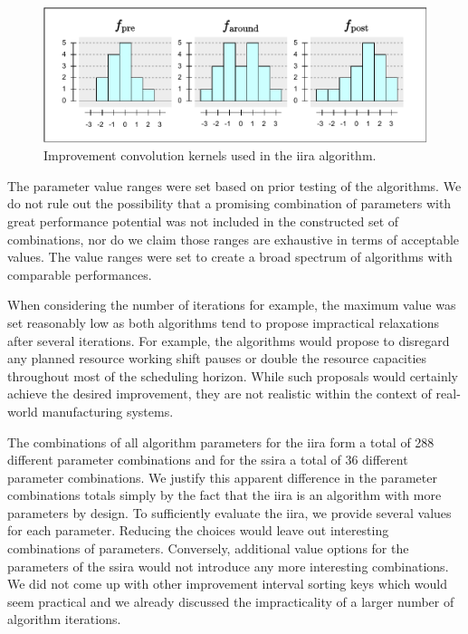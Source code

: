 \begin{figure}[hbt]
    \centering
    \includegraphics[width=\textwidth]{img/Convolutions.pdf}
    \caption{Improvement convolution kernels used in the \ac{iira} algorithm.}
    \label{fig:convolutions}
\end{figure}

The parameter value ranges were set based on prior testing of the algorithms.
We do not rule out the possibility that a promising combination of parameters
with great performance potential was not included in the constructed set of combinations,
nor do we claim those ranges are exhaustive in terms of acceptable values.
The value ranges were set to create a broad spectrum of algorithms with comparable performances.

When considering the number of iterations for example,
the maximum value was set reasonably low as both algorithms
tend to propose impractical relaxations after several iterations.
For example, the algorithms would propose to disregard any planned resource working shift pauses
or double the resource capacities throughout most of the scheduling horizon.
While such proposals would certainly achieve the desired improvement,
they are not realistic within the context of real-world manufacturing systems.

The combinations of all algorithm parameters
for the \ac{iira} form a total of 288 different parameter combinations and
for the \ac{ssira} a total of 36 different parameter combinations.
We justify this apparent difference in the parameter combinations totals
simply by the fact that the \ac{iira} is an algorithm with more parameters by design.
To sufficiently evaluate the \ac{iira}, we provide several values for each parameter.
Reducing the choices would leave out interesting combinations of parameters.
Conversely, additional value options for the parameters of the \ac{ssira}
would not introduce any more interesting combinations.
We did not come up with other improvement interval sorting keys which would seem practical
and we already discussed the impracticality of a larger number of algorithm iterations.


